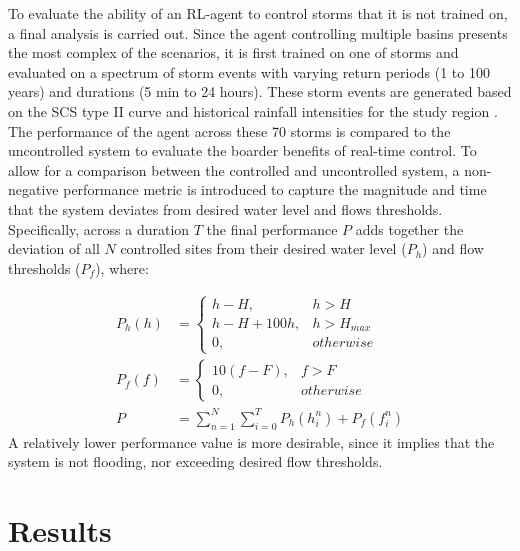To evaluate the ability of an RL-agent to control storms that it is not trained on, a final analysis is carried out.
Since the agent controlling multiple basins presents the most complex of the scenarios, it is first trained on one of storms and evaluated on a spectrum of storm events with varying return periods (1 to 100 years) and durations (5 min to 24 hours).
These storm events are generated based on the SCS type II curve and historical rainfall intensities for the study region \cite{scs1986urban}.
The performance of the agent across these 70 storms is compared to the uncontrolled system to evaluate the boarder benefits of real-time control.
To allow for a comparison between the controlled and uncontrolled system, a non-negative performance metric is introduced to capture the magnitude and time that the system deviates from desired water level and flows thresholds.
Specifically, across a duration $T$ the final performance $P$ adds together the deviation of all $N$ controlled sites from their desired water level ($P_h$) and flow thresholds ($P_f$), where:


\begin{align}
	P_h(h) &= \begin{cases}h-H, & h>H \\ h-H+100h,  &h>H_{max} \\0, & otherwise\end{cases} \\
	P_f(f) &= \begin{cases}10(f -F), & f>F \\0, & otherwise\end{cases} \\
	P &= \sum_{n=1}^N \sum_{i=0}^T P_h (h_i^n ) + P_f (f_i^n ) \label{perf_met}
\end{align}
A relatively lower performance value is more desirable, since it implies that the system is not flooding, nor exceeding desired flow thresholds.

\section{Results}


